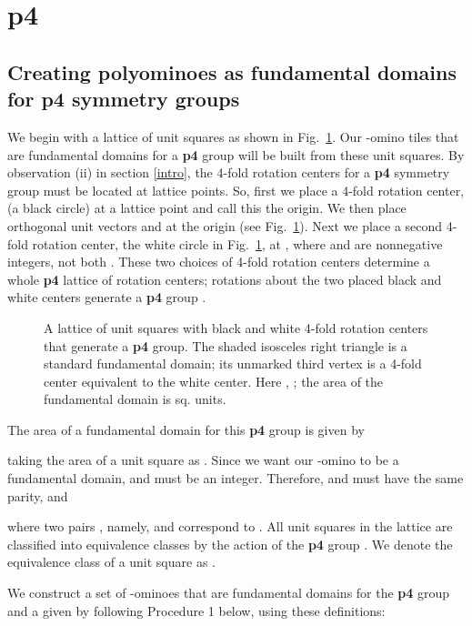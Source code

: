 \documentclass{ws-ijcga}
\begin{document}
\section{{\bf p4}}
\label{p4}
\subsection{Creating polyominoes as fundamental domains for {\bf p4} symmetry groups}
\label{p4:create}
We begin with a lattice of unit squares as shown in Fig.~\ref{fig:p4lattice}. 
Our -omino tiles that are fundamental domains for a {\bf p4} group will be built from these unit squares. 
By observation (ii) in section \ref{intro}, 
the 4-fold rotation centers for a {\bf p4} symmetry group must be located at lattice points.
So, first we place a 4-fold rotation center, (a black circle) at a lattice point and call this the origin.
We then place orthogonal unit vectors  and  at the origin (see Fig.~\ref{fig:p4lattice}). 
Next we place a second
4-fold rotation center, the white circle in Fig.~\ref{fig:p4lattice}, at , 
where  and  are nonnegative
integers, not both . These two choices of 4-fold rotation centers determine a whole {\bf p4} lattice of
rotation centers; rotations about the two placed black and white centers generate a {\bf p4} group .
\begin{figure}[h]
\centerline{}
\caption{
A lattice of unit squares with black and white 4-fold rotation centers that generate a {\bf p4} group. 
The shaded isosceles right triangle is a standard fundamental domain; 
its unmarked third vertex is a 4-fold center equivalent to
the white center. Here , ; the area of the fundamental domain is  sq. units.
\label{fig:p4lattice}
}
\end{figure}

The area  of a fundamental domain for this {\bf p4} group  is given by

taking the area of a unit square as . 
Since we want our -omino to be a fundamental domain,  and  must be an integer. 
Therefore,  and  must have the same parity, and

where two pairs , namely,  and  correspond to .
All unit squares in the lattice
are classified into  equivalence classes by the action of the {\bf p4} group . 
We denote the equivalence class of a unit square  as .

We construct a set  of -ominoes
that are fundamental domains for the {\bf p4} group  and a
given  by following Procedure 1 below, using these definitions:
\end{document}
